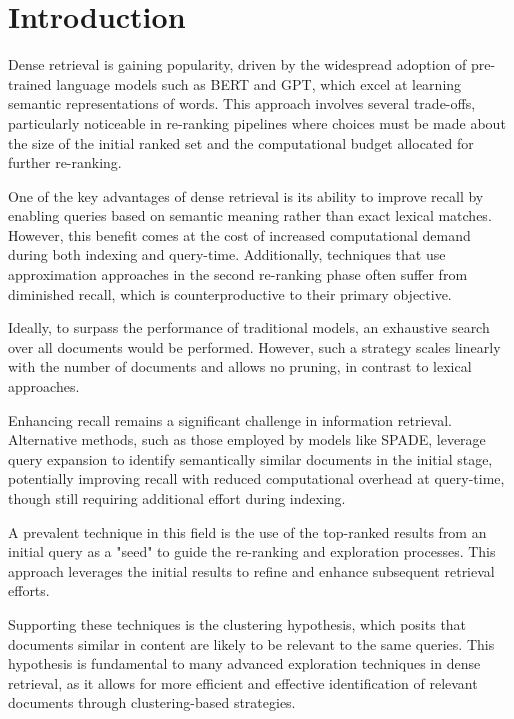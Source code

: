 \documentclass[sigconf,authorversion,nonacm]{acmart}
\begin{document}
\section{Introduction}

Dense retrieval is gaining popularity, driven by the widespread adoption of pre-trained language
models such as BERT and GPT, which excel at learning semantic representations of words. This approach
involves several trade-offs, particularly noticeable in re-ranking pipelines where choices must be
made about the size of the initial ranked set and the computational budget allocated for further
re-ranking.

One of the key advantages of dense retrieval is its ability to improve recall by enabling queries
based on semantic meaning rather than exact lexical matches. However, this benefit comes at the cost
of increased computational demand during both indexing and query-time. Additionally, techniques that
use approximation approaches in the second re-ranking phase often suffer from diminished recall,
which is counterproductive to their primary objective.

Ideally, to surpass the performance of traditional models, an exhaustive search over all documents
would be performed. However, such a strategy scales linearly with the number of documents and allows
no pruning, in contrast to lexical approaches.

Enhancing recall remains a significant challenge in information retrieval. Alternative methods, such
as those employed by models like SPADE\cite{spade}, leverage query expansion to identify semantically similar
documents in the initial stage, potentially improving recall with reduced computational overhead at
query-time, though still requiring additional effort during indexing.

A prevalent technique in this field is the use of the top-ranked results from an initial query as a
"seed" to guide the re-ranking and exploration processes. This approach leverages the initial
results to refine and enhance subsequent retrieval efforts.

Supporting these techniques is the clustering hypothesis\cite{clustering_hypothesis}, which posits that documents similar in
content are likely to be relevant to the same queries. This hypothesis is fundamental to many
advanced exploration techniques in dense retrieval, as it allows for more efficient and effective
identification of relevant documents through clustering-based strategies.
\end{document}
